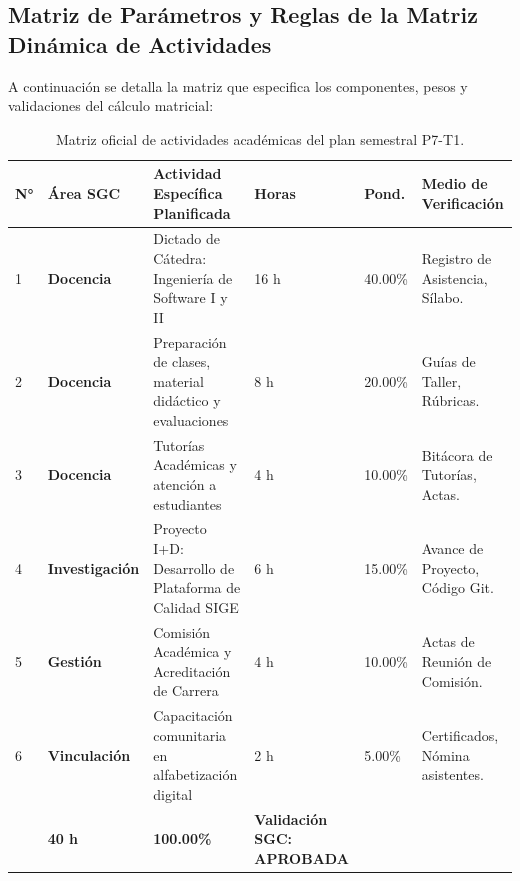 \documentclass[12pt,a4paper]{article}
\begin{document}
\subsection{Matriz de Parámetros y Reglas de la Matriz Dinámica de Actividades}
A continuación se detalla la matriz que especifica los componentes, pesos y validaciones del cálculo matricial:
\begin{table}[H]
\centering
\small
\renewcommand{\arraystretch}{1.15}
\begin{tabularx}{\textwidth}{|>{\hsize=0.3\hsize\centering\arraybackslash\footnotesize}X|>{\hsize=0.8\hsize\raggedright\arraybackslash\bfseries\footnotesize}X|>{\hsize=1.5\hsize\raggedright\arraybackslash\footnotesize}X|>{\hsize=0.4\hsize\centering\arraybackslash\footnotesize}X|>{\hsize=0.4\hsize\centering\arraybackslash\footnotesize}X|>{\hsize=0.6\hsize\raggedright\arraybackslash\footnotesize}X|}
\hline
\rowcolor{tableheader}
\textbf{N°} & \textbf{Área SGC} & \textbf{Actividad Específica Planificada} & \textbf{Horas} & \textbf{Pond.} & \textbf{Medio de Verificación} \\
\hline
1 & Docencia & Dictado de Cátedra: Ingeniería de Software I y II & 16 h & 40.00\% & Registro de Asistencia, Sílabo. \\
\hline
2 & Docencia & Preparación de clases, material didáctico y evaluaciones & 8 h & 20.00\% & Guías de Taller, Rúbricas. \\
\hline
3 & Docencia & Tutorías Académicas y atención a estudiantes & 4 h & 10.00\% & Bitácora de Tutorías, Actas. \\
\hline
4 & Investigación & Proyecto I+D: Desarrollo de Plataforma de Calidad SIGE & 6 h & 15.00\% & Avance de Proyecto, Código Git. \\
\hline
5 & Gestión & Comisión Académica y Acreditación de Carrera & 4 h & 10.00\% & Actas de Reunión de Comisión. \\
\hline
6 & Vinculación & Capacitación comunitaria en alfabetización digital & 2 h & 5.00\% & Certificados, Nómina asistentes. \\
\hline
\multicolumn{3}{|r|}{\textbf{TOTALES CONSOLIDADOS:}} & \textbf{40 h} & \textbf{100.00\%} & \textbf{Validación SGC: APROBADA} \\
\hline
\end{tabularx}
\caption{Matriz oficial de actividades académicas del plan semestral P7-T1.}
\label{tab:matriz_actividades_datos}
\end{table}
\end{document}
